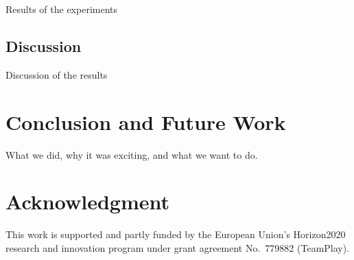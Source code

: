 \documentclass[conference]{IEEEtran}
\begin{document}
Results of the experiments

\subsection{Discussion}

Discussion of the results

\section{Conclusion and Future Work}
\label{sec:conclusion}

What we did, why it was exciting, and what we want to do.

\section*{Acknowledgment}

This work is supported and partly funded by the European Union’s Horizon2020 research and innovation program under grant agreement No.~779882 (TeamPlay).


 
\vspace{1ex}
\end{document}
